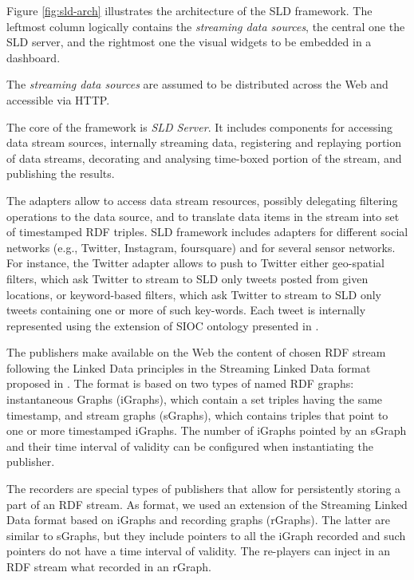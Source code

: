 Figure \ref{fig:sld-arch} illustrates the architecture of the SLD framework.  The leftmost column logically contains the \emph{streaming data sources}, the central one the SLD server, and the rightmost one the visual widgets to be embedded in a dashboard. 

The \emph{streaming data sources} are assumed to be distributed across the Web and accessible via HTTP.

The core of the framework is \emph{SLD Server}. It includes  components for accessing data stream sources, internally streaming data, registering and replaying portion of data streams,  decorating and analysing time-boxed portion of the stream, and publishing the results. 

The \textsf{adapters} allow to access data stream resources, possibly delegating filtering operations to the data source, and to translate data items in the stream into set of timestamped RDF triples. SLD framework includes adapters for different social networks (e.g., Twitter, Instagram, foursquare) and for several sensor networks. For instance, the Twitter adapter allows to push to Twitter either geo-spatial filters, which ask Twitter to stream to SLD only tweets posted from given locations, or keyword-based filters, which ask Twitter to stream to SLD only tweets containing one or more of such key-words. Each tweet is internally represented using the extension of SIOC ontology presented in \cite{DBLP:journals/ws/BalduiniCDVHLKT12}. 

The \textsf{publishers} make available on the Web the content of chosen RDF stream following the Linked Data principles \cite{DBLP:journals/ijswis/BizerHB09} in the Streaming Linked Data format proposed in \cite{DBLP:conf/www/BarbieriV10}. The format is based on two types of named RDF graphs: instantaneous Graphs (iGraphs), which contain a set triples having the same timestamp, and stream graphs (sGraphs), which contains triples that point to one or more timestamped iGraphs. The number of iGraphs pointed by an sGraph and their time interval of validity can be configured when instantiating the publisher.

The \textsf{recorders} are special types of publishers that allow for persistently storing a part of an RDF stream. As format, we used an extension of the Streaming Linked Data format based on iGraphs and recording graphs (rGraphs). The latter are similar to sGraphs, but they include pointers to all the iGraph recorded and such pointers do not have a time interval of validity. The \textsf{re-players} can inject in an RDF stream what recorded in an rGraph.

